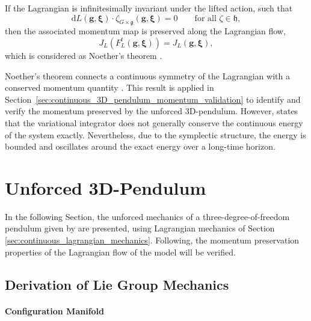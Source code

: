 \begin{theorem}
\label{thm:continuous_noether}
If the Lagrangian is infinitesimally invariant under the lifted action, such that
\begin{equation}
    \mathrm dL(\bm{g},\bm{\xi})\cdot
    \zeta_{G\times\mathfrak g}(\bm{g},\bm{\xi})=0
    \qquad
    \text{for all }\zeta\in\mathfrak h,
    \label{eq:infinitesimal_lagrangian_invariance}
\end{equation}
then the associated momentum map is preserved along the Lagrangian flow,
\begin{equation}
    J_L\!\left(F_L^t(\bm{g},\bm{\xi})\right)
    =
    J_L(\bm{g},\bm{\xi}),
    \label{eq:continuous_noether_momentum_preservation}
\end{equation}
which is considered as Noether's theorem \cite{Marsden2001}.
\end{theorem}

Noether's theorem connects a continuous symmetry of the Lagrangian with a conserved momentum quantity \cite{Lee2008,Marsden2001}. 
This result is applied in Section~\ref{sec:continuous_3D_pendulum_momentum_validation} to identify and verify the 
momentum preserved by the unforced 3D-pendulum. However, \cite{Marsden2001} states that 
the variational integrator does not generally conserve the continuous energy of the system exactly.
Nevertheless, due to the symplectic structure, the energy is bounded and oscillates around the exact energy over a long-time horizon.


\section{Unforced 3D-Pendulum}
\label{section:continuous_3D_pendulum}

In the following Section, the unforced mechanics of a three-degree-of-freedom pendulum given by \cite{Lee2008} are presented, using Lagrangian mechanics of Section \ref{sec:continuous_lagrangian_mechanics}. Following, the momentum preservation properties of the Lagrangian flow of the model will be verified. 

\subsection{Derivation of Lie Group Mechanics}

\paragraph{Configuration Manifold}

